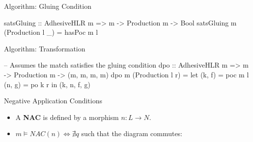 \documentclass[xcolor=dvipsnames,pdf,11pt,handout]{beamer}
\newcommand{\bi}{\begin{itemize}}
\newcommand{\ei}{\end{itemize}}
\newcommand{\tm}{\item}
\begin{document}
\begin{frame}[fragile]{Algorithm: Gluing Condition}{}

\color{blue}
\begin{haskell}
satsGluing :: AdhesiveHLR m => m -> Production m -> Bool
satsGluing m (Production l _) = hasPoc m l
\end{haskell}
\color{black}

\vspace{1cm}

\centerline{
}

\end{frame}

\begin{frame}[fragile]{Algorithm: Transformation}{}

\color{blue}
\begin{haskell}
-- Assumes the match satisfies the gluing condition
dpo :: AdhesiveHLR m => m -> Production m -> (m, m, m, m)
dpo m (Production l r) =
  let (k, f) = poc m l
      (n, g) = po k r
  in (k, n, f, g)
\end{haskell}
\color{black}

\vspace{.7cm}

\centerline{
}

\end{frame}

\begin{frame}[fragile]{Negative Application Conditions}{}

\bi
\tm A \textbf{NAC} is defined by a morphism $n : L \rightarrow N$.
\tm $m \vDash NAC(n) \Longleftrightarrow \nexists q$ such that the diagram commutes:
\ei

\vspace{.5cm}
\centerline{}

\end{frame}
\end{document}
